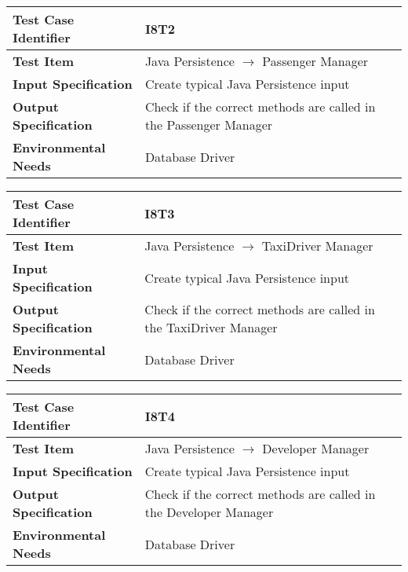 \begin{table}[!htbp]
\begin{center}
\begin{tabular}[t]{p{}|p{}}

\hline
\textbf{Test Case Identifier} & I8T2 \\
\hline
\textbf{Test Item} & Java Persistence $\rightarrow$ Passenger Manager \\
\hline
\textbf{Input Specification} & Create typical Java Persistence input \\
\hline
\textbf{Output Specification} & Check if the correct methods are called in the Passenger Manager \\
\hline
\textbf{Environmental Needs} & Database Driver \\
\hline

\end{tabular}
\end{center}
\end{table}

\begin{table}[!htbp]
\begin{center}
\begin{tabular}[t]{p{}|p{}}

\hline
\textbf{Test Case Identifier} & I8T3 \\
\hline
\textbf{Test Item} & Java Persistence $\rightarrow$ TaxiDriver Manager \\
\hline
\textbf{Input Specification} & Create typical Java Persistence input \\
\hline
\textbf{Output Specification} & Check if the correct methods are called in the TaxiDriver Manager \\
\hline
\textbf{Environmental Needs} & Database Driver \\
\hline

\end{tabular}
\end{center}
\end{table}

\begin{table}[!htbp]
\begin{center}
\begin{tabular}[t]{p{}|p{}}

\hline
\textbf{Test Case Identifier} & I8T4 \\
\hline
\textbf{Test Item} & Java Persistence $\rightarrow$ Developer Manager \\
\hline
\textbf{Input Specification} & Create typical Java Persistence input \\
\hline
\textbf{Output Specification} & Check if the correct methods are called in the Developer Manager \\
\hline
\textbf{Environmental Needs} & Database Driver \\
\hline

\end{tabular}
\end{center}
\end{table}

